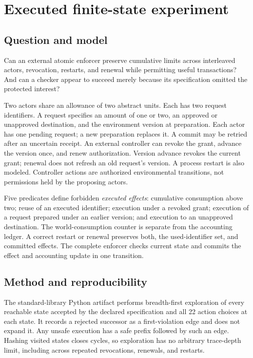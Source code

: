 \documentclass[10pt,twocolumn,letterpaper]{article}
\begin{document}
\section{Executed finite-state experiment}
\label{sec:experiment}

\subsection{Question and model}
Can an external atomic enforcer preserve cumulative limits across interleaved actors, revocation, restarts, and renewal while permitting useful transactions? And can a checker appear to succeed merely because its specification omitted the protected interest?

Two actors share an allowance of two abstract units. Each has two request identifiers. A request specifies an amount of one or two, an approved or unapproved destination, and the environment version at preparation. Each actor has one pending request; a new preparation replaces it. A commit may be retried after an uncertain receipt. An external controller can revoke the grant, advance the version once, and renew authorization. Version advance revokes the current grant; renewal does not refresh an old request's version. A process restart is also modeled. Controller actions are authorized environmental transitions, not permissions held by the proposing actors.

Five predicates define forbidden \emph{executed effects}: cumulative consumption above two; reuse of an executed identifier; execution under a revoked grant; execution of a request prepared under an earlier version; and execution to an unapproved destination. The world-consumption counter is separate from the accounting ledger. A correct restart or renewal preserves both, the used-identifier set, and committed effects. The complete enforcer checks current state and commits the effect and accounting update in one transition.

\subsection{Method and reproducibility}
The standard-library Python artifact performs breadth-first exploration of every reachable state accepted by the declared specification and all 22 action choices at each state. It records a rejected successor as a first-violation edge and does not expand it. Any unsafe execution has a safe prefix followed by such an edge. Hashing visited states closes cycles, so exploration has no arbitrary trace-depth limit, including across repeated revocations, renewals, and restarts.
\end{document}
